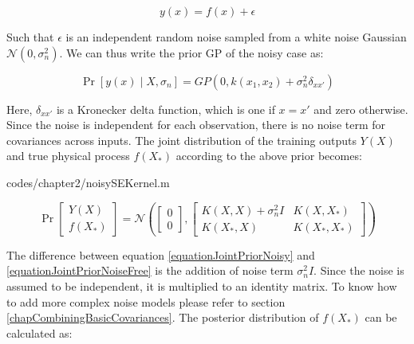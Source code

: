 \begin{equation}\label{eqNoiseEquation}
y(x) = f(x) + \epsilon
\end{equation}

Such that $\epsilon$ is an independent random noise sampled from a white noise Gaussian $\mathcal{N}(0, \sigma_{n}^{2})$. We can thus write the prior GP of the noisy case as:

\begin{equation}\label{equationMeanZeroGPNoisydefinition}
\Pr[y(x) \mid X, \sigma_{n}] = GP(0 , k(x_{1}, x_{2}) + \sigma^{2}_{n}\delta_{xx'})
\end{equation}

Here, $\delta_{xx'}$ is a Kronecker delta function, which is one if $x = x'$ and zero otherwise. Since the noise is independent for each observation, there is no noise term for covariances across inputs. The joint distribution of the training outputs $Y(X)$ and true physical process $f(X_{*})$ according to the above prior becomes:

\begin{mdframed}[hidealllines=true,backgroundcolor=lightgray!20]

                    {codes/chapter2/noisySEKernel.m}
\end{mdframed}

\begin{equation}\label{equationJointPriorNoisy}
\Pr\left [ \begin{matrix}
Y(X)
\\ f(X_{*})
\end{matrix} \right ]
= 
\mathcal{N}\left (
\left [ \begin{matrix}
0
\\ 0

\end{matrix} \right ] , \left [ \begin{matrix}
K(X, X) + \sigma^{2}_{n}I & K(X, X_{*})\\ 
K(X_{*}, X) & K(X_{*}, X_{*})
\end{matrix} \right ] 
\right )
\end{equation}

The difference between equation \ref{equationJointPriorNoisy} and \ref{equationJointPriorNoiseFree} is the addition of noise term $\sigma^{2}_{n}I$. Since the noise is assumed to be independent, it is multiplied to an identity matrix. To know how to add more complex noise models please refer to section \ref{chapCombiningBasicCovariances}. The posterior distribution of $f(X_{*})$ can be calculated as:

